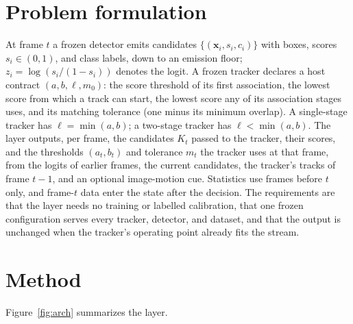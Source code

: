 \documentclass[pdflatex,sn-mathphys-num,iicol]{sn-jnl}
\begin{document}
\section{Problem formulation}\label{sec:problem}
At frame $t$ a frozen detector emits candidates $\{(\mathbf{x}_i, s_i, c_i)\}$ with boxes, scores $s_i\in(0,1)$, and class labels, down to an emission floor; $z_i=\log(s_i/(1-s_i))$ denotes the logit. A frozen tracker declares a host contract $(a, b, \ell, m_0)$: the score threshold of its first association, the lowest score from which a track can start, the lowest score any of its association stages uses, and its matching tolerance (one minus its minimum overlap). A single-stage tracker has $\ell=\min(a,b)$; a two-stage tracker has $\ell<\min(a,b)$. The layer outputs, per frame, the candidates $K_t$ passed to the tracker, their scores, and the thresholds $(a_t,b_t)$ and tolerance $m_t$ the tracker uses at that frame, from the logits of earlier frames, the current candidates, the tracker's tracks of frame $t-1$, and an optional image-motion cue. Statistics use frames before $t$ only, and frame-$t$ data enter the state after the decision. The requirements are that the layer needs no training or labelled calibration, that one frozen configuration serves every tracker, detector, and dataset, and that the output is unchanged when the tracker's operating point already fits the stream.

\section{Method}\label{sec:method}
Figure~\ref{fig:arch} summarizes the layer.
\end{document}
